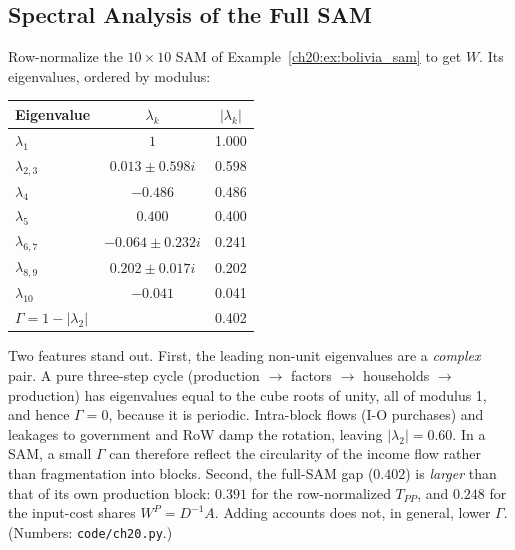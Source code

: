 \documentclass[../structural_economics_book.tex]{subfiles}
\begin{document}
\subsection{Spectral Analysis of the Full SAM}

\begin{example}\label{ch20:ex:spectral}
Row-normalize the $10 \times 10$ SAM of Example~\ref{ch20:ex:bolivia_sam} to get $W$. Its eigenvalues, ordered by modulus:

\begin{center}
\begin{tabular}{lcc}
\toprule
Eigenvalue & $\lambda_k$ & $|\lambda_k|$ \\
\midrule
$\lambda_1$ & $1$ & 1.000 \\
$\lambda_{2,3}$ & $0.013 \pm 0.598i$ & 0.598 \\
$\lambda_4$ & $-0.486$ & 0.486 \\
$\lambda_5$ & $0.400$ & 0.400 \\
$\lambda_{6,7}$ & $-0.064 \pm 0.232i$ & 0.241 \\
$\lambda_{8,9}$ & $0.202 \pm 0.017i$ & 0.202 \\
$\lambda_{10}$ & $-0.041$ & 0.041 \\
\midrule
$\Gamma = 1 - |\lambda_2|$ & & 0.402 \\
\bottomrule
\end{tabular}
\end{center}

Two features stand out. First, the leading non-unit eigenvalues are a \emph{complex} pair. A pure three-step cycle (production $\to$ factors $\to$ households $\to$ production) has eigenvalues equal to the cube roots of unity, all of modulus 1, and hence $\Gamma = 0$, because it is periodic. Intra-block flows (I-O purchases) and leakages to government and RoW damp the rotation, leaving $|\lambda_2| = 0.60$. In a SAM, a small $\Gamma$ can therefore reflect the circularity of the income flow rather than fragmentation into blocks. Second, the full-SAM gap ($0.402$) is \emph{larger} than that of its own production block: $0.391$ for the row-normalized $T_{PP}$, and $0.248$ for the input-cost shares $W^P = D^{-1}A$. Adding accounts does not, in general, lower $\Gamma$. (Numbers: \texttt{code/ch20.py}.)
\end{example}
\end{document}
